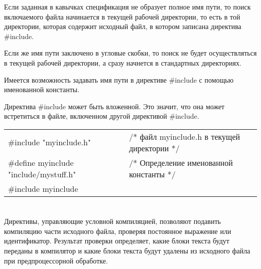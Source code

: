 Если заданная в кавычках спецификация не образует полное имя пути, то поиск включаемого файла начинается в текущей рабочей директории, то есть в той директории, которая содержит исходный файл, в котором записана директива \#include.\killoverfullbefore

Если же имя пути заключено в угловые скобки, то поиск не будет осуществляться в текущей рабочей директории, а сразу начнется в стандартных директориях.\killoverfullbefore

Имеется возможность задавать имя пути в директиве \#include с помощью именованной константы. \killoverfullbefore

Директива \#include может быть вложенной. Это значит, что она может встретиться в файле, включенном другой директивой \#include. \killoverfullbefore \BL

\renewcommand{\arraystretch}{1.2} %
\renewcommand{\tabcolsep}{0.2cm}   %
\begin{pExample}
\begin{tabular}{ l l }
\#include "myinclude.h" & \textcolor{exComm}{/* файл myinclude.h в текущей директории */
}  \\
\#define myinclude "include/mystuff.h" & \textcolor{exComm}{/* Определение именованной константы */} \\
\#include myinclude & \textcolor{exComm}{} \\
\end{tabular}
\end{pExample}


\section{}

Директивы, управляющие условной компиляцией, позволяют подавить компиляцию части исходного файла, проверяя постоянное выражение или идентификатор. Результат проверки определяет, какие блоки текста будут переданы в компилятор и какие блоки текста будут удалены из исходного файла при предпроцессорной обработке. \killoverfullbefore

\subsection{}

